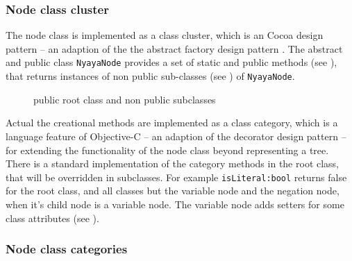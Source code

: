 \subsubsection{Node class cluster}

The node class is implemented as a class cluster, 
which is an Cocoa design pattern \cite[p.282ff]{Buck:2009:CDP:1803585}
– an adaption of the the abstract factory design pattern \cite[p.87ff]{GAMMAETAL}.
The abstract and public class \verb+NyayaNode+ 
provides a set of static and public methods (see ),
that returns instances of non public sub-classes (see )
of \verb+NyayaNode+.

\begin{figure}[htbp]
\begin{center}
\caption{public root class and non public subclasses}
\label{fig:NyayaNodeCluster}
\end{center}
\end{figure}

Actual the creational methods are implemented as a class category, 
which is a language feature of Objective-C \cite[p.225ff]{Kochan:2009:PO:1538451}
– an adaption of the decorator design pattern \cite[p.175ff]{GAMMAETAL} –
for extending the functionality of the node class beyond representing a tree. 
There is a standard implementation of the category methods in the root class,
that will be overridden in subclasses.
For example \verb+isLiteral:bool+ returns false for the root class, and all classes but the variable node
and the negation node, when it's child node is a variable node.
The variable node adds setters for some class attributes (see ).

\subsubsection{Node class categories}

